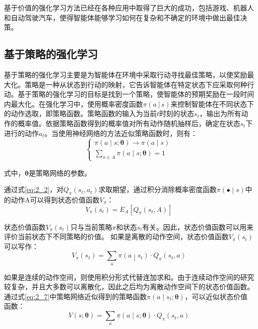 基于价值的强化学习方法已经在各种应用中取得了巨大的成功，包括游戏、机器人和自动驾驶汽车，使得智能体能够学习如何在复杂和不确定的环境中做出最佳决策。


\subsection{基于策略的强化学习}

基于策略的强化学习主要是为智能体在环境中采取行动寻找最佳策略，以使奖励最大化。策略是一种从状态到行动的映射，它告诉智能体在特定状态下应采取何种行动。基于策略的强化学习的目标是找到一个策略，使智能体的预期奖励在一段时间内最大化。在强化学习中，使用概率密度函数$\pi(a│s)$来控制智能体在不同状态下的动作选取，即策略函数。策略函数的输入为当前$t$时刻的状态$s_t$，输出为所有动作的概率值。依据策略函数得到的概率值对所有动作随机抽样后，确定在状态$s_t$下进行的动作$a_t$。当使用神经网络的方法近似策略函数时，则有：
\begin{equation}
\label{eq:2_7}
\left\{\begin{array}{l}
\pi(a \mid s ; \boldsymbol{\theta}) \rightarrow \pi(a \mid s) \\
\sum_{a \in A} \pi(a \mid s ; \boldsymbol{\theta})=1
\end{array}\right.
\end{equation}

式中，$\boldsymbol{\theta}$是策略网络的参数。

通过式\ref{eq:2_2}，对$Q_\pi\left(s_t,a_t\right)$求取期望，通过积分消除概率密度函数$\pi\left(\bullet\middle| s\right)$中的动作A可以得到状态价值函数$V_\pi$：
\begin{equation}
\label{eq:2_8}
V_\pi\left(s_t\right)=E_A[Q_\pi (s_t,A)]
\end{equation}

状态价值函数$V_\pi\left(s_t\right)$只与当前策略$\pi$和状态$s_t$有关。因此，状态价值函数可以用来评价当前状态下不同策略的价值。
	如果是离散的动作空间，状态价值函数$V_\pi\left(s_t\right)$可以写作：
\begin{equation}	
\label{eq:2_9}
V_\pi\left(s_t\right)=\sum_{a}{\pi\left(a\middle| s_t\right)\cdot}Q_\pi\left(s_t,a\right)
\end{equation}

如果是连续的动作空间，则使用积分形式代替连加求和。由于连续动作空间的研究较复杂，并且大多数可以离散化，因此之后均为离散动作空间下的状态价值函数。通过式\ref{eq:2_7}中策略网络近似得到的策略函数$\pi(a\mid s_t;\boldsymbol{\theta})$，可以近似状态价值函数：
\begin{equation}	
\label{eq:2_10}
V(s ; \boldsymbol{\theta})=\sum_a \pi(a \mid s ; \boldsymbol{\theta}) \cdot Q_\pi\left(s_t, a\right)
\end{equation}

